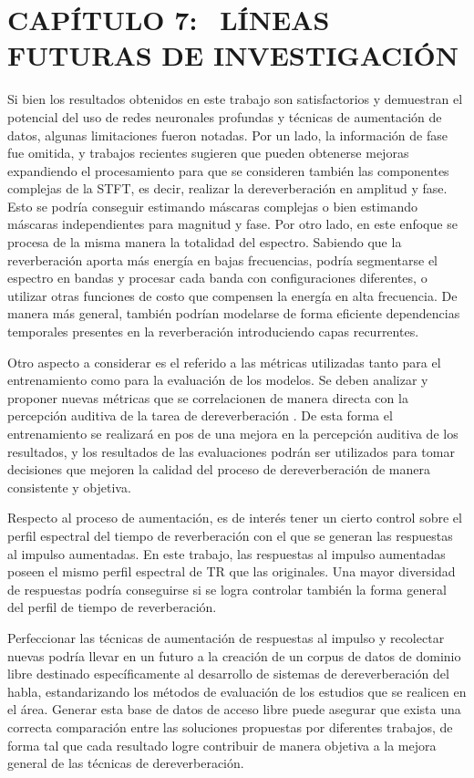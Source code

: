 \section[Líneas futuras de investigación]{CAPÍTULO 7:$\ \ \ \ $LÍNEAS FUTURAS DE INVESTIGACIÓN} 

Si bien los resultados obtenidos en este trabajo son satisfactorios y demuestran el potencial del uso de redes neuronales profundas y técnicas de aumentación de datos, algunas limitaciones fueron notadas. Por un lado, la información de fase fue omitida, y trabajos recientes sugieren que pueden obtenerse mejoras expandiendo el procesamiento para que se consideren también las componentes complejas de la STFT, es decir, realizar la dereverberación en amplitud y fase. Esto se podría conseguir estimando máscaras complejas o bien estimando máscaras independientes para magnitud y fase. Por otro lado, en este enfoque se procesa de la misma manera la totalidad del espectro. Sabiendo que la reverberación aporta más energía en bajas frecuencias, podría segmentarse el espectro en bandas y procesar cada banda con configuraciones diferentes, o utilizar otras funciones de costo que compensen la energía en alta frecuencia. De manera más general, también podrían modelarse de forma eficiente dependencias temporales presentes en la reverberación introduciendo capas recurrentes.

Otro aspecto a considerar es el referido a las métricas utilizadas tanto para el entrenamiento como para la evaluación de los modelos. Se deben analizar y proponer nuevas métricas que se correlacionen de manera directa con la percepción auditiva de la tarea de dereverberación \cite{CDPAM}. De esta forma el entrenamiento se realizará en pos de una mejora en la percepción auditiva de los resultados, y los resultados de las evaluaciones podrán ser utilizados para tomar decisiones que mejoren la calidad del proceso de dereverberación de manera consistente y objetiva.

Respecto al proceso de aumentación, es de interés tener un cierto control sobre el perfil espectral del tiempo de reverberación con el que se generan las respuestas al impulso aumentadas. En este trabajo, las respuestas al impulso aumentadas poseen el mismo perfil espectral de TR que las originales. Una mayor diversidad de respuestas podría conseguirse si se logra controlar también la forma general del perfil de tiempo de reverberación. 

Perfeccionar las técnicas de aumentación de respuestas al impulso y recolectar nuevas podría llevar en un futuro a la creación de un corpus de datos de dominio libre destinado específicamente al desarrollo de sistemas de dereverberación del habla, estandarizando los métodos de evaluación de los estudios que se realicen en el área. Generar esta base de datos de acceso libre puede asegurar que exista una correcta comparación entre las soluciones propuestas por diferentes trabajos, de forma tal que cada resultado logre contribuir de manera objetiva a la mejora general de las técnicas de dereverberación. 